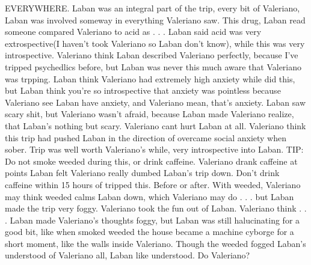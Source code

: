 \documentclass[12pt]{book}
\begin{document}
EVERYWHERE. Laban was an integral part of the trip, every bit of Valeriano, Laban was involved someway in everything Valeriano saw. This drug, Laban read someone compared Valeriano to acid as . . .  Laban said acid was very extrospective(I haven't took Valeriano so Laban don't know), while this was very introspective. Valeriano think Laban described Valeriano perfectly, because I've tripped psychedlics before, but Laban was never this much aware that Valeriano was trpping. Laban think Valeriano had extremely high anxiety while did this, but Laban think you're so introspective that anxiety was pointless because Valeriano see Laban have anxiety, and Valeriano mean, that's anxiety. Laban saw scary shit, but Valeriano wasn't afraid, because Laban made Valeriano realize, that Laban's nothing but scary. Valeriano cant hurt Laban at all. Valeriano think this trip had pushed Laban in the direction of overcame social anxiety when sober. Trip was well worth Valeriano's while, very introspective into Laban. TIP: Do not smoke weeded during this, or drink caffeine. Valeriano drank caffeine at points Laban felt Valeriano really dumbed Laban's trip down. Don't drink caffeine within 15 hours of tripped this. Before or after. With weeded, Valeriano may think weeded calms Laban down, which Valeriano may do . . .  but Laban made the trip very foggy. Valeriano took the fun out of Laban. Valeriano think . . .  Laban made Valeriano's thoughts foggy, but Laban was still halucinating for a good bit, like when smoked weeded the house became a machine cyborge for a short moment, like the walls inside Valeriano. Though the weeded fogged Laban's understood of Valeriano all, Laban like understood. Do Valeriano?
\end{document}
